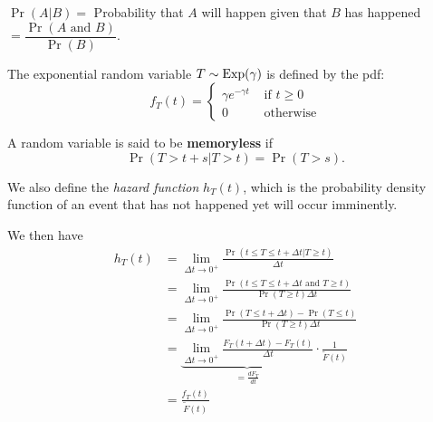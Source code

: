 \begin{SaveDefinition}[key=ConditionalProb, title={Conditional Probability}]
$\Pr(A|B) = $ Probability that $A$ will happen given that $B$ has happened $= \dfrac{\Pr(A \text{ and } B)}{\Pr(B)}$.
\end{SaveDefinition}



\begin{SaveDefinition}[key=Exponential, title={Exponential Random Variable}]

The exponential random variable $T \sim {\rm Exp}(\gamma)$ is defined by the pdf:
\[ f_T(t) = \begin{cases}
 	\gamma e^{-\gamma t} & \text{ if }  t \geq 0 \\
 	0 	& \text{ otherwise}
 \end{cases}
\]
\end{SaveDefinition}


\begin{SaveDefinition}[key=memoryless, title={Memoryless Random Variable}]

A random variable is said to be \textbf{memoryless} if
\[
\Pr(T > t+s | T > t) = \Pr(T>s).
\]
\end{SaveDefinition}




\begin{SaveDefinition}[key=hazard, title={Hazard function}]
	
We also define the \textit{hazard function} $h_T(t)$, which is the probability density function of an event that has not happened yet will occur imminently.

We then have
\begin{align*}
	h_T(t)
		& = \lim_{\Delta t \to 0^+} \frac{\Pr( t \leq T \leq t+\Delta t | T \geq t)}{\Delta t} \\
		& = \lim_{\Delta t \to 0^+} \frac{\Pr( t \leq T \leq t+\Delta t \text{ and } T \geq t)}{\Pr(T \geq t) \Delta t} \\
		& = \lim_{\Delta t \to 0^+} \frac{\Pr(T \leq t+\Delta t) - \Pr(T \leq t)}{\Pr(T \geq t)\Delta t} \\
		& = \underbrace{\lim_{\Delta t \to 0^+} \frac{F_T(t+\Delta t) - F_T(t)}{\Delta t}}_{=\frac{dF_T}{dt}} \cdot \frac{1}{\tilde{F}(t)}\\
		& = \frac{f_T(t)}{\tilde{F}(t)}
\end{align*}
\end{SaveDefinition}




